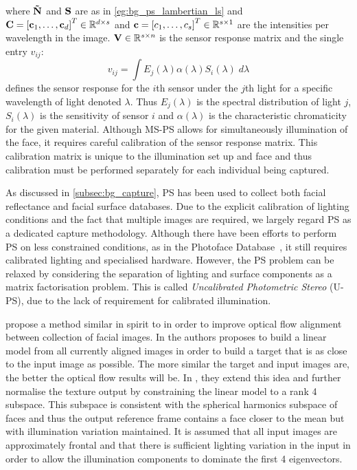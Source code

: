 where $\boldsymbol{\mathbf{\tilde{N}}}$ and $\boldsymbol{\mathbf{S}}$ are as in \cref{eg:bg_ps_lambertian_ls}
and $\boldsymbol{\mathbf{C}} = {[\boldsymbol{\mathbf{c}}_1, \ldots, \boldsymbol{\mathbf{c}}_d]}^T \in \mathbb{R}^{d \times s}$ and
$\boldsymbol{\mathbf{c}} = {[c_1, \ldots, c_s]}^T \in \mathbb{R}^{s \times 1}$ are the intensities
per wavelength in the image. $\boldsymbol{\mathbf{V}} \in \mathbb{R}^{s \times n}$ is the sensor
response matrix and the single entry $v_{ij}$:
\begin{equation}\label{eg:bg_ps_sensor_response}
	v_{ij} = \int E_j(\lambda) \alpha(\lambda) S_i(\lambda) \; d\lambda
\end{equation}
defines the sensor response for the $i$th sensor under the $j$th light for
a specific wavelength of light denoted $\lambda$. Thus $E_j(\lambda)$ is the
spectral distribution of light $j$, $S_i(\lambda)$ is the sensitivity
of sensor $i$ and $\alpha(\lambda)$ is the characteristic chromaticity for the
given material. Although MS-PS allows for simultaneously illumination of the
face, it requires careful calibration of the sensor response matrix. This
calibration matrix is unique to the illumination set up and face and thus
calibration must be performed separately for each individual
being captured.

As discussed in \cref{subsec:bg_capture}, PS has been used to collect both
facial reflectance and facial surface databases. Due to the explicit
calibration of lighting conditions and the fact that multiple images are
required, we largely regard PS as a dedicated capture methodology. Although
there have been efforts to perform PS on less constrained conditions, as in
the Photoface Database~\cite{zafeiriou2013photoface}, it still requires calibrated
lighting and specialised hardware. However, the PS problem can be relaxed by
considering the separation of lighting and surface components as a matrix
factorisation problem. This is called
\textit{Uncalibrated Photometric Stereo} (U-PS), due to the lack of
requirement for calibrated illumination.

\citet{kemelmacher2012collection} propose a method similar in spirit to
\citet{vetter1997bootstrapping} in order to improve optical flow alignment
between collection of facial images. In \citet{vetter1997bootstrapping} the
authors proposes to build a linear model from all currently aligned images in
order to build a target that is as close to the input image as possible. The
more similar the target and input images are, the better the optical flow
results will be. In \citet{kemelmacher2012collection}, they extend this
idea and further normalise the texture output by constraining the linear
model to a rank 4 subspace. This subspace is consistent with the spherical 
harmonics subspace of faces and thus the output reference frame contains 
a face closer to the mean but with illumination variation maintained. It is 
assumed that all input images are approximately frontal and that there is 
sufficient lighting variation in the input in order to allow the illumination
components to dominate the first 4 eigenvectors.
